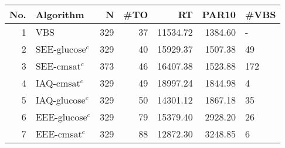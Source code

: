 \begin{tabular}{rlrrrrl}
\toprule
No. & Algorithm & N & #TO & RT & PAR10 & #VBS \\
\midrule
1 & VBS & 329 & 37 & 11534.72 & 1384.60 & - \\
2 & SEE-glucose$^c$ & 329 & 40 & 15929.37 & 1507.38 & 49 \\
3 & SEE-cmsat$^c$ & 373 & 46 & 16407.38 & 1523.88 & 172 \\
4 & IAQ-cmsat$^c$ & 329 & 49 & 18997.24 & 1844.98 & 4 \\
5 & IAQ-glucose$^c$ & 329 & 50 & 14301.12 & 1867.18 & 35 \\
6 & EEE-glucose$^c$ & 329 & 79 & 15379.40 & 2928.20 & 26 \\
7 & EEE-cmsat$^c$ & 329 & 88 & 12872.30 & 3248.85 & 6 \\
\bottomrule
\end{tabular}
